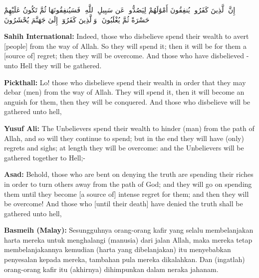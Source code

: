 \documentclass[11pt,a4paper,openany]{book}
\let\textAR\textarabic
\newcommand{\quranverse}[1]{{\centering\Large\textAR{#1}\par}}
\begin{document}
\begin{quranbox}[Qur'an 8:36]
\quranverse{إِنَّ ٱلَّذِينَ كَفَرُوا۟ يُنفِقُونَ أَمْوَٰلَهُمْ لِيَصُدُّوا۟ عَن سَبِيلِ ٱللَّهِ ۚ فَسَيُنفِقُونَهَا ثُمَّ تَكُونُ عَلَيْهِمْ حَسْرَةً ثُمَّ يُغْلَبُونَ ۗ وَٱلَّذِينَ كَفَرُوٓا۟ إِلَىٰ جَهَنَّمَ يُحْشَرُونَ}

\vspace{6pt}
\noindent\textbf{Sahih International:} Indeed, those who disbelieve spend their wealth to avert [people] from the way of Allah. So they will spend it; then it will be for them a [source of] regret; then they will be overcome. And those who have disbelieved - unto Hell they will be gathered.

\vspace{4pt}
\noindent\textbf{Pickthall:} Lo! those who disbelieve spend their wealth in order that they may debar (men) from the way of Allah. They will spend it, then it will become an anguish for them, then they will be conquered. And those who disbelieve will be gathered unto hell,

\vspace{4pt}
\noindent\textbf{Yusuf Ali:} The Unbelievers spend their wealth to hinder (man) from the path of Allah, and so will they continue to spend; but in the end they will have (only) regrets and sighs; at length they will be overcome: and the Unbelievers will be gathered together to Hell;-

\vspace{4pt}
\noindent\textbf{Asad:} Behold, those who are bent on denying the truth are spending their riches in order to turn others away from the path of God; and they will go on spending them until they become [a source of] intense regret for them; and then they will be overcome! And those who [until their death] have denied the truth shall be gathered unto hell,

\vspace{4pt}
\noindent\textbf{Basmeih (Malay):} Sesungguhnya orang-orang kafir yang selalu membelanjakan harta mereka untuk menghalangi (manusia) dari jalan Allah, maka mereka tetap membelanjakannya kemudian (harta yang dibelanjakan) itu menyebabkan penyesalan kepada mereka, tambahan pula mereka dikalahkan. Dan (ingatlah) orang-orang kafir itu (akhirnya) dihimpunkan dalam neraka jahanam.
\end{quranbox}
\end{document}
